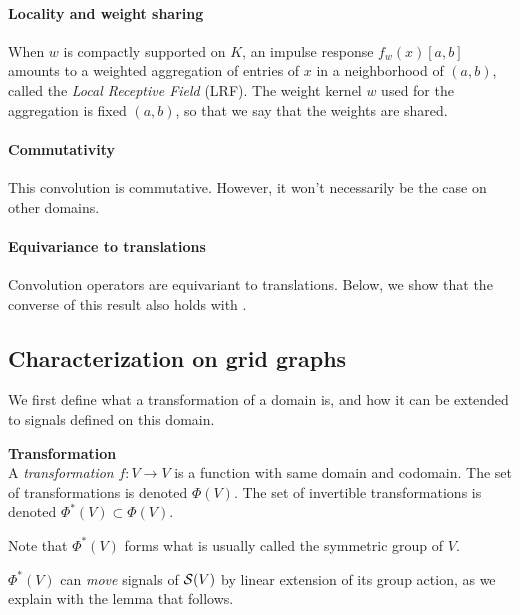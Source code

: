 \paragraph{Locality and weight sharing}
When $w$ is compactly supported on $K$, an impulse response $f_w(x)[a,b]$ amounts to a weighted aggregation of entries of $x$ in a neighborhood of $(a,b)$, called the \emph{Local Receptive Field} (LRF). The weight kernel $w$ used for the aggregation is fixed \wrt $(a,b)$, so that we say that the weights are shared.

\paragraph{Commutativity}
This convolution is commutative. However, it won't necessarily be the case on other domains.

\paragraph{Equivariance to translations}
Convolution operators are equivariant to translations. Below, we show that the converse of this result also holds with .

\subsection{Characterization on grid graphs}

We first define what a transformation of a domain is, and how it can be extended to signals defined on this domain.

\begin{definition}\textbf{Transformation}\\
A \emph{transformation} $f: V \rightarrow V$ is a function with same domain and codomain. The set of transformations is denoted $\Phi(V)$. The set of invertible transformations is denoted $\Phi^*(V) \subset \Phi(V)$.
\end{definition}

\begin{remark}
Note that $\Phi^*(V)$ forms what is usually called the symmetric group of $V$.
\end{remark}

$\Phi^*(V)$ can \emph{move} signals of $\mathcal{S}(V)$ by linear extension of its group action, as we explain with the lemma that follows.

